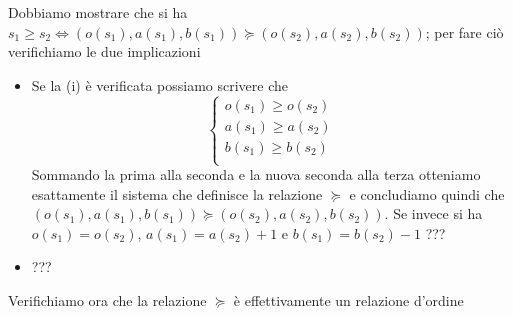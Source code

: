 Dobbiamo mostrare che si ha $ s_1 \geq s_2 \iff (o(s_1), a(s_1), b(s_1)) \succeq (o(s_2), a(s_2), b(s_2)) $; per fare ciò verifichiamo le due implicazioni
\begin{itemize}[label=$ \Rightarrow $]
\item Se la (i) è verificata possiamo scrivere che
  \[\begin{cases*}
      o(s_1) \geq o(s_2) \\
      a(s_1) \geq a(s_2) \\
      b(s_1) \geq b(s_2) \\
    \end{cases*}\]
  Sommando la prima alla seconda e la nuova seconda alla terza otteniamo esattamente il sistema che definisce la relazione $ \succeq $ e concludiamo quindi che $ (o(s_1), a(s_1), b(s_1)) \succeq (o(s_2), a(s_2), b(s_2)) $. Se invece si ha $ o(s_1) = o(s_2) $, $ a(s_1) = a(s_2) + 1 $ e $ b(s_1) = b(s_2) - 1 $ ???
\end{itemize}
\begin{itemize}[label=$ \Leftarrow $]
\item ???
\end{itemize}
Verifichiamo ora che la relazione $ \succeq $ è effettivamente un relazione d'ordine
